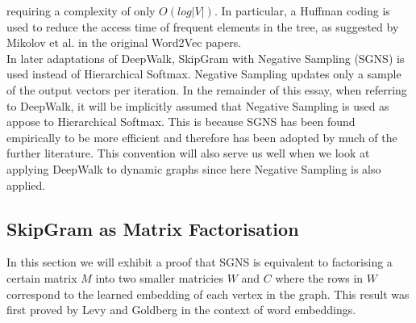 \documentclass[a4paper]{article}
\begin{document}
requiring a complexity of only $O(log|V|)$. In particular, a Huffman coding is
used to reduce the access time of frequent elements in the tree, as suggested by
Mikolov et al. in the original Word2Vec
papers.\cite{mikolov2013efficient,mikolov2013distributed}\\
In later adaptations of DeepWalk, SkipGram with Negative Sampling (SGNS) is used instead of
Hierarchical Softmax. Negative Sampling updates only a sample of the output
vectors per iteration. In the remainder of this essay, when referring to DeepWalk, it will be
implicitly assumed that Negative Sampling is used as appose to Hierarchical
Softmax. This is because SGNS has been found empirically to be more efficient
and therefore has been adopted by much of the further literature\cite{mikolov2013distributed}. This convention will also
serve us well when we look at applying DeepWalk to dynamic graphs since here
Negative Sampling is also applied.\\
\subsection{SkipGram as Matrix Factorisation}
In this section we will exhibit a proof that SGNS is
equivalent to factorising a certain matrix $M$ into two smaller matricies $W$
and $C$ where the rows in $W$ correspond to the learned embedding of each vertex
in the graph. This result was first proved by Levy and
Goldberg\cite{levy&goldberg} in the context of word embeddings.\\
\end{document}
